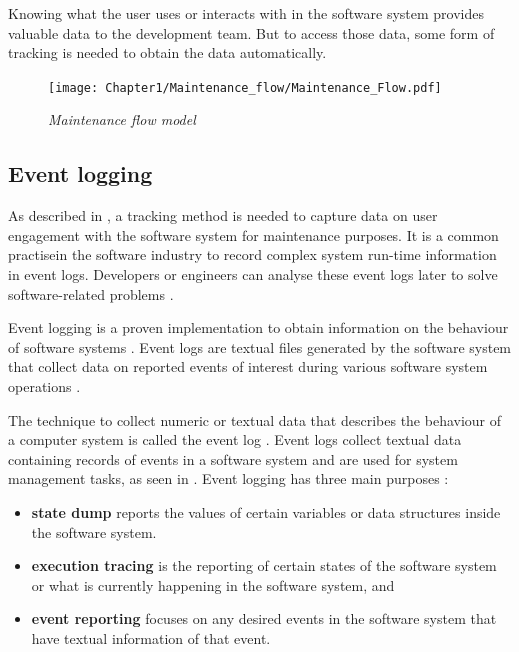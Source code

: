 \clearpage

Knowing what the user uses or interacts with in the software system provides valuable data to the development team. But to access those data, some form of tracking is needed to obtain the data automatically.

\begin{figure}[!htb]
	\centering %
	\texttt{[image: Chapter1/Maintenance\_flow/Maintenance\_Flow.pdf]}
	\caption[Maintenance flow model]
	{\textit{Maintenance flow model \cite{Tang2010}}} \label{fig:ch1_maintenanceFlow}
\end{figure}

\clearpage

\subsection{Event logging}\label{sec:ch1_eventLogging}
As described in , a tracking method is needed to capture data on user engagement with the software system for maintenance purposes. It is a common practisein the software industry to record complex system run-time information in event logs. Developers or engineers can analyse these event logs later to solve software-related problems \cite{Zhu2019}. \par Event logging is a proven implementation to obtain information on the behaviour of software systems \cite{Baccanico2014}. Event logs are textual files generated by the software system that collect data on reported events of interest during various software system operations \cite{Cinque2013, Baccanico2014}.

\par The technique to collect numeric or textual data that describes the behaviour of a computer system is called the event log \cite{Pecchia2015, Baccanico2014}. Event logs collect textual data containing records of events in a software system and are used for system management tasks, as seen in  \cite{Rong2018a, Rong2018, Baccanico2014}. Event logging has three main purposes \cite{Pecchia2015, Baccanico2014}:

\begin{itemize}
	\item \textbf{state dump} reports the values of certain variables or data structures inside the software system.
	\item \textbf{execution tracing} is the reporting of certain states of the software system or what is currently happening in the software system, and
	\item \textbf{event reporting} focuses on any desired events in the software system that have textual information of that event.
\end{itemize}

